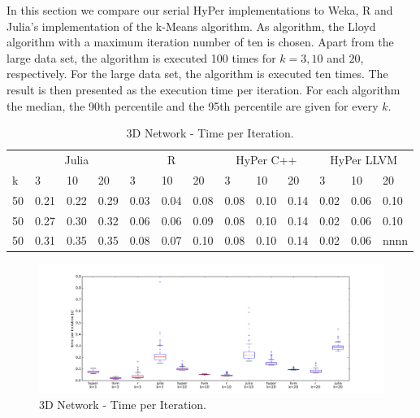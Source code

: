 In this section we compare our serial HyPer implementations to Weka, R and Julia’s implementation of the k-Means algorithm. As algorithm, the Lloyd algorithm with a maximum iteration number of ten is chosen. Apart from the large data set, the algorithm is executed 100 times for $k = 3, 10$ and $20$, respectively. For the large data set, the algorithm is executed ten times. The result is then presented as the execution time per iteration. For each algorithm the median, the 90th percentile and the 95th percentile are given for every $k$. 
\\
\begin{table}[htsb]
  \caption[3D Network - Time per Iteration]{3D Network - Time per Iteration.}
  \label{tab:network_all}
  \centering
  \begin{tabular}{l l l l l l l l l l l l l}
    \toprule
      & \multicolumn{3}{c}{Julia} & \multicolumn{3}{c}{R} & \multicolumn{3}{c}{HyPer C++} & \multicolumn{3}{c}{HyPer LLVM}  \\
      k & 3 & 10 & 20 & 3 & 10 & 20 & 3 & 10 & 20 & 3 & 10 & 20 \\
    \midrule
      50  & 0.21 & 0.22 & 0.29 & 0.03 & 0.04 & 0.08 & 0.08 & 0.10 & 0.14 & 0.02 & 0.06 & 0.10 \\
      50  & 0.27 & 0.30 & 0.32 & 0.06 & 0.06 & 0.09 & 0.08 & 0.10 & 0.14 & 0.02 & 0.06 & 0.10 \\
      50  & 0.31 & 0.35 & 0.35 & 0.08 & 0.07 & 0.10 & 0.08 & 0.10 & 0.14 & 0.02 & 0.06 & nnnn \\
    \bottomrule
  \end{tabular}
\end{table}

\begin{figure}[htsb]
  \raggedleft
  \includegraphics[scale=0.4, trim="0cm 1cm 0cm 0cm"]{figures/charts/network_all}
  \caption[3D Network - Time per Iteration]{3D Network - Time per Iteration.}
  \label{fig:network_all}
\end{figure}


